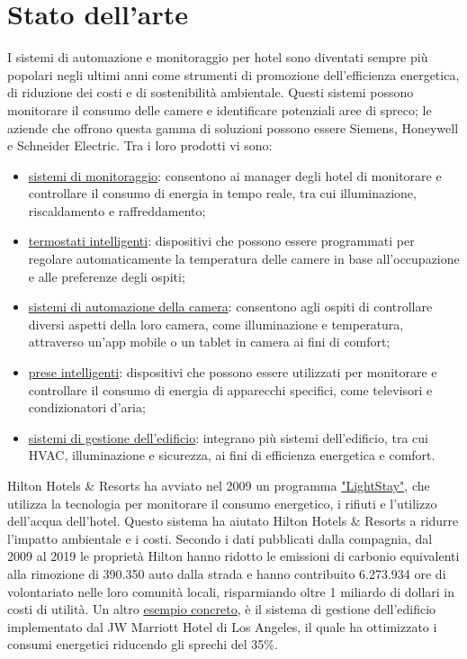 
\section{Stato dell'arte}

I sistemi di automazione e monitoraggio per hotel sono diventati sempre più popolari negli ultimi anni come strumenti di promozione dell'efficienza energetica, di riduzione dei costi e di sostenibilità ambientale. Questi sistemi possono monitorare il consumo delle camere e identificare potenziali aree di spreco; le aziende che offrono questa gamma di soluzioni possono essere Siemens, Honeywell e Schneider Electric. Tra i loro prodotti vi sono:

\begin{itemize}
    \item \underline{sistemi di monitoraggio}: consentono ai manager degli hotel di monitorare e controllare il consumo di energia in tempo reale, tra cui illuminazione, riscaldamento e raffreddamento;
    \item \underline{termostati intelligenti}: dispositivi che possono essere programmati per regolare automaticamente la temperatura delle camere in base all'occupazione e alle preferenze degli ospiti;
    \item \underline{sistemi di automazione della camera}: consentono agli ospiti di controllare diversi aspetti della loro camera, come illuminazione e temperatura, attraverso un'app mobile o un tablet in camera ai fini di comfort;
    \item \underline{prese intelligenti}: dispositivi che possono essere utilizzati per monitorare e controllare il consumo di energia di apparecchi specifici, come televisori e condizionatori d'aria;
    \item \underline{sistemi di gestione dell'edificio}: integrano più sistemi dell'edificio, tra cui HVAC, illuminazione e sicurezza, ai fini di efficienza energetica e comfort.
\end{itemize}

Hilton Hotels \& Resorts ha avviato nel 2009 un programma \href{https://stories.hilton.com/hilton-history/lightstay-a-decade-of-managing-our-environmental-and-social-impact}{"LightStay"}, che utilizza la tecnologia per monitorare il consumo energetico, i rifiuti e l'utilizzo dell'acqua dell'hotel. Questo sistema ha aiutato Hilton Hotels \& Resorts a ridurre l'impatto ambientale e i costi. Secondo i dati pubblicati dalla compagnia, dal 2009 al 2019 le proprietà Hilton hanno ridotto le emissioni di carbonio equivalenti alla rimozione di 390.350 auto dalla strada e hanno contribuito 6.273.934 ore di volontariato nelle loro comunità locali, risparmiando oltre 1 miliardo di dollari in costi di utilità. Un altro \href{https://new.abb.com/news/detail/87127/abbs-hvac-solution-helps-jw-marriott-hotel-to-cut-down-energy-losses-by-35}{esempio concreto}, è il sistema di gestione dell'edificio implementato dal JW Marriott Hotel di Los Angeles, il quale ha ottimizzato i consumi energetici riducendo gli sprechi del 35\%. 

